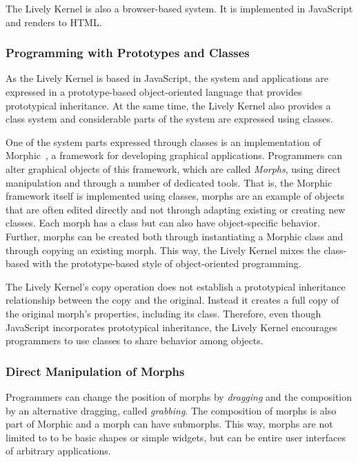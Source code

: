 The Lively Kernel is also a browser-based system.
It is implemented in JavaScript and renders to HTML.

\subsubsection{Programming with Prototypes and Classes}

As the Lively Kernel is based in JavaScript, the system and applications are expressed in a prototype-based object-oriented language that provides prototypical inheritance.
At the same time, the Lively Kernel also provides a class system and considerable parts of the system are expressed using classes.

One of the system parts expressed through classes is an implementation of Morphic~\cite{Maloney1995Mor}, a framework for developing graphical applications.
Programmers can alter graphical objects of this framework, which are called \emph{Morphs}, using direct manipulation and through a number of dedicated tools.
That is, the Morphic framework itself is implemented using classes, morphs are an example of objects that are often edited directly and not through adapting existing or creating new classes.
Each morph has a class but can also have object-specific behavior.
Further, morphs can be created both through instantiating a Morphic class and through copying an existing morph.
This way, the Lively Kernel mixes the class-based with the prototype-based style of object-oriented programming.

The Lively Kernel's copy operation does not establish a prototypical inheritance relationship between the copy and the original.
Instead it creates a full copy of the original morph's properties, including its class.
Therefore, even though JavaScript incorporates prototypical inheritance, the Lively Kernel encourages programmers to use classes to share behavior among objects.

\subsubsection{Direct Manipulation of Morphs}

Programmers can change the position of morphs by \emph{dragging} and the composition by an alternative dragging, called \emph{grabbing}.
The composition of morphs is also part of Morphic and a morph can have submorphs.
This way, morphs are not limited to to be basic shapes or simple widgets, but can be entire user interfaces of arbitrary applications.

